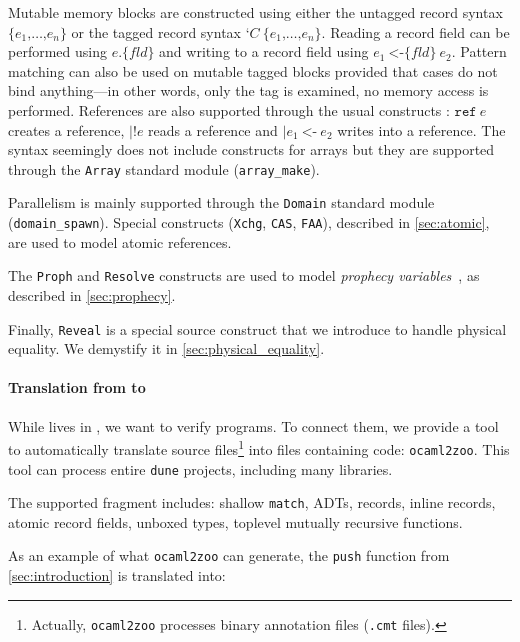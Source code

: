 Mutable memory blocks are constructed using either the untagged record syntax $\texttt{\{} e_1 \texttt{,} \dots \texttt{,} e_n \texttt{\}}$ or the tagged record syntax $\texttt{‘} C\ \texttt{\{} e_1 \texttt{,} \dots \texttt{,} e_n \texttt{\}}$.
Reading a record field can be performed using $e \texttt{.\{} \mathit{fld} \texttt{\}}$ and writing to a record field using $e_1\ \texttt{<-\{} \mathit{fld} \texttt{\}}\ e_2$.
Pattern matching can also be used on mutable tagged blocks provided that cases do not bind anything---in other words, only the tag is examined, no memory access is performed.
References are also supported through the usual constructs : $\texttt{ref}\ e$ creates a reference, $\mid \texttt{!} e$ reads a reference and $\mid e_1\ \texttt{<-}\ e_2$ writes into a reference.
The syntax seemingly does not include constructs for arrays but they are supported through the \texttt{Array} standard module (\eg \texttt{array\_make}).

Parallelism is mainly supported through the \texttt{Domain} standard module (\eg \texttt{domain\_spawn}).
Special constructs (\texttt{Xchg}, \texttt{CAS}, \texttt{FAA}), described in \cref{sec:atomic}, are used to model atomic references.

The \texttt{Proph} and \texttt{Resolve} constructs are used to model \emph{prophecy variables}~\cite{DBLP:journals/pacmpl/JungLPRTDJ20}, as described in \cref{sec:prophecy}.

Finally, \texttt{Reveal} is a special source construct that we introduce to handle physical equality.
We demystify it in \cref{sec:physical_equality}.

\paragraph{Translation from \OCaml to \ZooLang}

While \ZooLang lives in \Coq, we want to verify \OCaml programs.
To connect them, we provide a tool to automatically translate \OCaml source files\footnote{Actually, \texttt{ocaml2zoo} processes binary annotation files (\texttt{.cmt} files).} into \Coq files containing \ZooLang code: \texttt{ocaml2zoo}.
This tool can process entire \texttt{dune} projects, including many libraries.

The supported \OCaml fragment includes: shallow \texttt{match}, ADTs, records, inline records, atomic record fields, unboxed types, toplevel mutually recursive functions.

As an example of what \texttt{ocaml2zoo} can generate, the \texttt{push} function from \cref{sec:introduction} is translated into:

